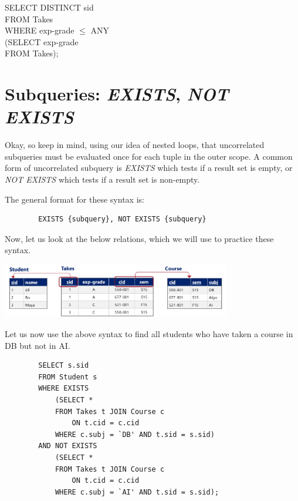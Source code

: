 \documentclass{article}
\begin{document}
\begin{tcolorbox}
    SELECT DISTINCT sid\\
    FROM Takes\\
    WHERE exp-grade $\leq$ ANY\\
        (SELECT exp-grade\\
        FROM Takes);\\
\end{tcolorbox}


\section*{Subqueries: \textit{EXISTS}, \textit{NOT EXISTS}}

Okay, so keep in mind, using our idea of nested loops, that uncorrelated subqueries must be evaluated once for each tuple in the outer scope. A common form of uncorrelated subquery is \textit{EXISTS} which tests if a result set is empty, or \textit{NOT EXISTS} which tests if a result set is non-empty.

The general format for these syntax is:

\begin{tcolorbox}
    \begin{verbatim}
        EXISTS {subquery}, NOT EXISTS {subquery}
    \end{verbatim}
\end{tcolorbox}

Now, let us look at the below relations, which we will use to practice these syntax. 

\includegraphics[width=10cm]{Assets/existsExample.png}

Let us now use the above syntax to find all students who have taken a course in DB but not in AI.

\begin{tcolorbox}
    \begin{verbatim}
        SELECT s.sid
        FROM Student s
        WHERE EXISTS 
            (SELECT *
            FROM Takes t JOIN Course c
                ON t.cid = c.cid
            WHERE c.subj = `DB' AND t.sid = s.sid)
        AND NOT EXISTS
            (SELECT *
            FROM Takes t JOIN Course c
                ON t.cid = c.cid
            WHERE c.subj = `AI' AND t.sid = s.sid);
    \end{verbatim}
\end{tcolorbox}
\end{document}
